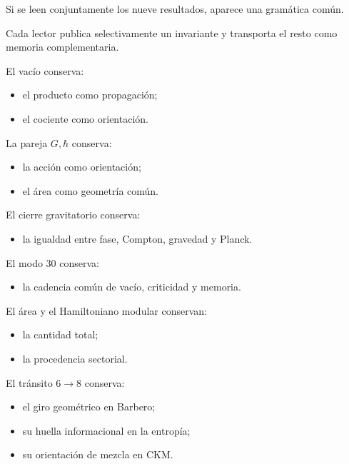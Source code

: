 Si se leen conjuntamente los nueve resultados, aparece una gramática común.\par

Cada lector publica selectivamente un invariante y transporta el resto como memoria complementaria.\par

El vacío conserva:\par

\begin{itemize}[leftmargin=*,itemsep=0.35em]
\item el producto como propagación;
\item el cociente como orientación.
\end{itemize}

La pareja \(G,\hbar\) conserva:\par

\begin{itemize}[leftmargin=*,itemsep=0.35em]
\item la acción como orientación;
\item el área como geometría común.
\end{itemize}

El cierre gravitatorio conserva:\par

\begin{itemize}[leftmargin=*,itemsep=0.35em]
\item la igualdad entre fase, Compton, gravedad y Planck.
\end{itemize}

El modo \(30\) conserva:\par

\begin{itemize}[leftmargin=*,itemsep=0.35em]
\item la cadencia común de vacío, criticidad y memoria.
\end{itemize}

El área y el Hamiltoniano modular conservan:\par

\begin{itemize}[leftmargin=*,itemsep=0.35em]
\item la cantidad total;
\item la procedencia sectorial.
\end{itemize}

El tránsito \(6\to8\) conserva:\par

\begin{itemize}[leftmargin=*,itemsep=0.35em]
\item el giro geométrico en Barbero;
\item su huella informacional en la entropía;
\item su orientación de mezcla en CKM.
\end{itemize}

